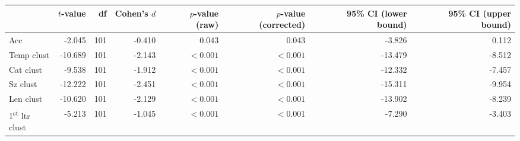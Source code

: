 \begin{tabular}{lrrrrrrr}
\toprule
{} & $t$-value &  df & Cohen's $d$ & $p$-value (raw) & $p$-value (corrected) & 95\% CI (lower bound) & 95\% CI (upper bound) \\
\midrule
Acc                             &    -2.045 & 101 &      -0.410 &           0.043 &                 0.043 &                -3.826 &                 0.112 \\
Temp clust                      &   -10.689 & 101 &      -2.143 &       $< 0.001$ &             $< 0.001$ &               -13.479 &                -8.512 \\
Cat clust                       &    -9.538 & 101 &      -1.912 &       $< 0.001$ &             $< 0.001$ &               -12.332 &                -7.457 \\
Sz clust                        &   -12.222 & 101 &      -2.451 &       $< 0.001$ &             $< 0.001$ &               -15.311 &                -9.954 \\
Len clust                       &   -10.620 & 101 &      -2.129 &       $< 0.001$ &             $< 0.001$ &               -13.902 &                -8.239 \\
1\textsuperscript{st} ltr clust &    -5.213 & 101 &      -1.045 &       $< 0.001$ &             $< 0.001$ &                -7.290 &                -3.403 \\
\bottomrule
\end{tabular}
